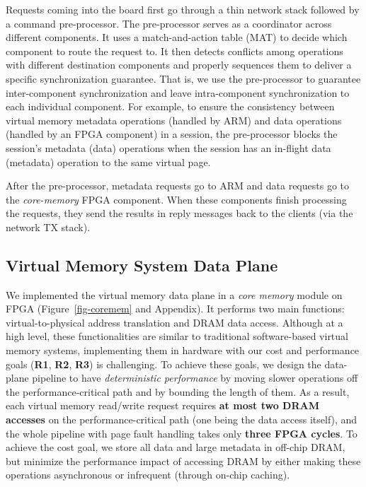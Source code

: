 Requests coming into the board first go through a thin network stack followed by a command pre-processor. 
The pre-processor serves as a coordinator across different components.
It uses a match-and-action table (MAT) to decide which component to route the request to.
It then detects conflicts among operations with different destination components 
and properly sequences them to deliver a specific synchronization guarantee.
That is, we use the pre-processor to guarantee inter-component synchronization
and leave intra-component synchronization to each individual component.
For example, to ensure the consistency between virtual memory metadata operations (handled by ARM)
and data operations (handled by an FPGA component) in a session,
the pre-processor blocks the session's metadata (data) operations when the session has an in-flight data (metadata) operation
to the same virtual page.

After the pre-processor, metadata requests go to ARM and data requests go to the {\em core-memory} FPGA component.
When these components finish processing the requests, they send the results in reply messages
back to the clients (via the network TX stack).


\subsection{Virtual Memory System Data Plane}
\label{sec:dataplane}
We implemented the virtual memory data plane in a {\em core memory} module on FPGA (Figure~\ref{fig-coremem} and Appendix).
It performs two main functions: virtual-to-physical address translation and DRAM data access.
Although at a high level, these functionalities are similar to traditional software-based virtual memory systems,
implementing them in hardware with our cost and performance goals (\textbf{R1}, \textbf{R2}, \textbf{R3}) is challenging.
To achieve these goals, we design the data-plane pipeline to have {\em deterministic performance} %
by moving slower operations off the performance-critical path and by bounding the length of them. 
As a result, each virtual memory read/write request requires \textbf{at most two DRAM accesses} 
on the performance-critical path (one being the data access itself), 
and the whole pipeline with page fault handling takes only \textbf{three FPGA cycles}. 
To achieve the cost goal, we store all data and large metadata in off-chip DRAM, but minimize the performance impact
of accessing DRAM by either making these operations asynchronous or infrequent (through on-chip caching).

